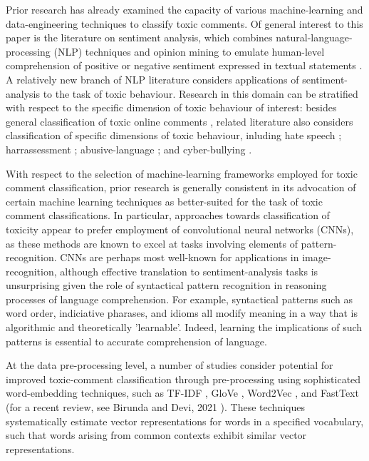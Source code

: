 
Prior research has already examined the capacity of various machine-learning and data-engineering techniques to classify toxic comments. 
Of general interest to this paper is the literature on sentiment analysis, which combines natural-language-processing (NLP) techniques and opinion mining to emulate human-level comprehension of positive or negative sentiment expressed in textual statements \cite{chowdhary2020natural, cambria2014jumping}.
A relatively new branch of NLP literature considers applications of sentiment-analysis to the task of toxic behaviour. 
Research in this domain can be stratified with respect to the specific dimension of toxic behaviour of interest: besides general classification of toxic online comments \cite{georgakopoulos2018convolutional,van2018challenges,risch2020toxic}, related literature also considers classification of specific dimensions of toxic behaviour, inluding hate speech \cite{mullah2021advances, ayo2020machine, rizos2019augment, yang2019exploring}; harrassessment \cite{abarna2022identification, basu2021cyberpolice, marwa2018deep}; abusive-language \cite{vidgen2020directions, nobata2016abusive, bourgonje2017automatic}; and cyber-bullying \cite{kanan2020cyber, akhter2019cyber, di2016unsupervised}.

With respect to the selection of machine-learning frameworks employed for toxic comment classification, prior research is generally consistent in its advocation of certain machine learning techniques as better-suited for the task of toxic comment classifications. In particular, approaches towards classification of toxicity appear to prefer employment of convolutional neural networks (CNNs), as these methods are known to excel at tasks involving elements of pattern-recognition. CNNs are perhaps most well-known for applications in image-recognition, although effective translation to sentiment-analysis tasks is unsurprising given the role of syntactical pattern recognition in reasoning processes of language comprehension. For example, syntactical patterns such as word order, indiciative pharases, and idioms all modify meaning in a way that is algorithmic and theoretically 'learnable'. Indeed, learning the implications of such patterns is essential to accurate comprehension of language. 

At the data pre-processing level, a number of studies consider potential for improved toxic-comment classification through pre-processing using sophisticated word-embedding techniques, such as TF-IDF \cite{luhn1957statistical, jones1972statistical}, GloVe \cite{pennington2014glove}, Word2Vec \cite{mikolov2013efficient,mikolov2013distributed}, and FastText \cite{bojanowski2017enriching, joulin2016bag, joulin2016fasttext} (for a recent review, see Birunda and Devi, 2021 \cite{selva2021review}). These techniques systematically estimate vector representations for words in a specified vocabulary, such that words arising from common contexts exhibit similar vector representations.

